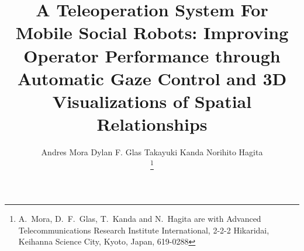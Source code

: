 \documentclass[a4paper, 10pt, conference]{ieeeconf}     %
\title{\LARGE \bf A Teleoperation System For Mobile Social Robots: Improving Operator Performance through Automatic Gaze Control and 3D Visualizations of Spatial Relationships}
\author{
\alignauthor Andres Mora \hspace{1cm} Dylan F. Glas \hspace{1cm} Takayuki Kanda\hspace{1cm} Norihito Hagita\\
\email{\{andresmora, dylan, kanda, hagita\}@atr.jp}
\thanks{A.~Mora, D.~F.~Glas, T.~Kanda and N.~Hagita are with Advanced Telecommunications Research Institute International, 2-2-2 Hikaridai, Keihanna Science City, Kyoto, Japan, 619-0288}\\
}
\begin{document}
\maketitle

\thispagestyle{empty}
\pagestyle{empty}


\begin{abstract}


\end{abstract}
\end{document}
